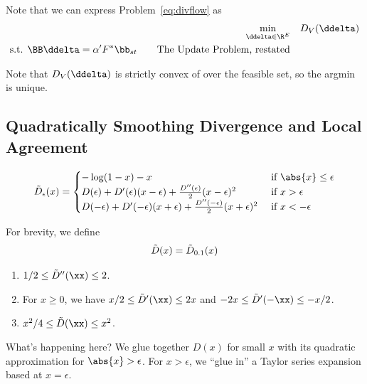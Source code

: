 Note that we can express Problem~\eqref{eq:divflow} as
\begin{align}
   \label{eq:divflow2}
  \min_{\ddelta \in \R^E} & \quad 
      D_V( \ddelta )
  \\
  \textrm{s.t. }  \BB\ddelta = \alpha' F^* \bb_{st}
\tag*{The Update Problem, restated}
\end{align}

Note that  $D_V( \ddelta )$ is strictly convex of over the
feasible set, so the argmin is unique.

\subsection{Quadratically Smoothing Divergence and Local Agreement}

\[
  \sdiv_{\epsilon}(x) =
  \begin{cases}
    -\log(1-x) - x & \text{ if } \abs{x} \leq \epsilon \\
    D(\epsilon) + D'(\epsilon) (x - \epsilon) 
    +\frac{D''(\epsilon)}{2} (x - \epsilon)^2
    & \text{ if }  x > \epsilon \\
    D(-\epsilon) + D'(-\epsilon) (x + \epsilon) 
    +\frac{D''(-\epsilon)}{2} (x +\epsilon)^2
    & \text{ if }  x < -\epsilon \\
  \end{cases}
\]

For brevity, we define
\[
  \tilde{D}(x) =\tilde{D}_{0.1}(x) 
\]
\begin{lemma}
  \label{lem:sdivderivs}
  \noindent
  \begin{enumerate}
  \item $1/2 \leq \sdiv''(\xx) \leq 2$.
  \item For $x \geq 0$, we have $x/2 \leq \sdiv'(\xx) \leq 2x$
and $-2x \leq \sdiv'(-\xx) \leq -x/2$.
\item $x^2/4 \leq \sdiv(\xx) \leq x^2$.
  \end{enumerate}
\end{lemma}

What's happening here? We glue together $D(x)$ for small $x$ with its
quadratic approximation for $\abs{x} > \epsilon$.
For $x > \epsilon$, we ``glue in'' a Taylor series expansion based at $x =
\epsilon$.

